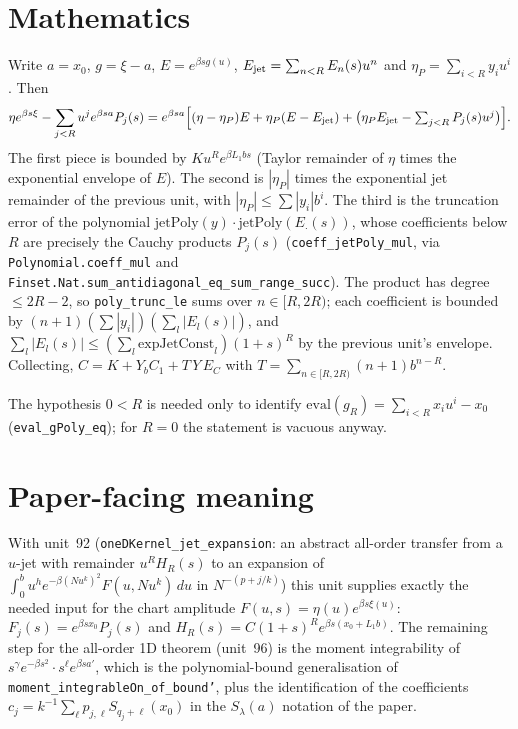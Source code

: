 \documentclass[11pt]{article}
\begin{document}
\section{Mathematics}

Write $a=x_0$, $g=\xi-a$, $E=e^{\beta sg(u)}$, $E_{\rm jet}=\sum_{n<R}E_n(s)u^n$ and
$\eta_P=\sum_{i<R}y_iu^i$. Then
\[
\eta e^{\beta s\xi}-\sum_{j<R}u^je^{\beta sa}P_j(s)
 = e^{\beta sa}\Big[(\eta-\eta_P)E+\eta_P(E-E_{\rm jet})
   +\big(\eta_PE_{\rm jet}-\textstyle\sum_{j<R}P_j(s)u^j\big)\Big].
\]
The first piece is bounded by $Ku^Re^{\beta L_1bs}$ (Taylor remainder of $\eta$ times the
exponential envelope of $E$). The second is $|\eta_P|$ times the exponential jet remainder of the
previous unit, with $|\eta_P|\le\sum|y_i|b^i$. The third is the truncation error of the polynomial
$\mathrm{jetPoly}(y)\cdot\mathrm{jetPoly}(E_\cdot(s))$, whose coefficients below $R$ are precisely the
Cauchy products $P_j(s)$ (\texttt{coeff\_jetPoly\_mul}, via \texttt{Polynomial.coeff\_mul} and
\texttt{Finset.Nat.sum\_antidiagonal\_eq\_sum\_range\_succ}). The product has degree $\le 2R-2$, so
\texttt{poly\_trunc\_le} sums over $n\in[R,2R)$; each coefficient is bounded by
$(n+1)(\sum|y_i|)(\sum_l|E_l(s)|)$, and $\sum_l|E_l(s)|\le(\sum_l\mathrm{expJetConst}_l)(1+s)^R$ by the
previous unit's envelope. Collecting, $C=K+Y_bC_1+T\,Y\,E_C$ with
$T=\sum_{n\in[R,2R)}(n+1)b^{n-R}$.

The hypothesis $0<R$ is needed only to identify $\mathrm{eval}(g_R)=\sum_{i<R}x_iu^i-x_0$
(\texttt{eval\_gPoly\_eq}); for $R=0$ the statement is vacuous anyway.

\section{Paper-facing meaning}

With unit~92 (\texttt{oneDKernel\_jet\_expansion}: an abstract all-order transfer from a $u$-jet
with remainder $u^RH_R(s)$ to an expansion of $\int_0^b u^h e^{-\beta(Nu^k)^2}F(u,Nu^k)\,du$ in
$N^{-(p+j/k)}$) this unit supplies exactly the needed input for the chart amplitude
$F(u,s)=\eta(u)e^{\beta s\xi(u)}$: $F_j(s)=e^{\beta sx_0}P_j(s)$ and
$H_R(s)=C(1+s)^Re^{\beta s(x_0+L_1b)}$. The remaining step for the all-order 1D theorem
(unit~96) is the moment integrability of $s^\gamma e^{-\beta s^2}\cdot s^\ell e^{\beta sa'}$, which is
the polynomial-bound generalisation of \texttt{moment\_integrableOn\_of\_bound'}, plus the
identification of the coefficients $c_j=k^{-1}\sum_\ell p_{j,\ell}S_{q_j+\ell}(x_0)$ in the
$S_\lambda(a)$ notation of the paper.
\end{document}
